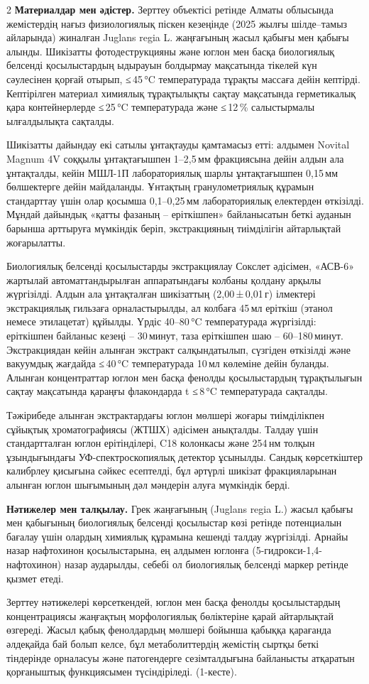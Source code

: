 \begin{multicols}{2}
{\bfseries Материалдар мен әдістер.} Зерттеу объектісі ретінде Алматы
облысында жемістердің нағыз физиологиялық піскен кезеңінде (2025 жылғы
шілде--тамыз айларында) жиналған Juglans regia L. жаңғағының жасыл
қабығы мен қабығы алынды. Шикізатты фотодеструкцияны және юглон мен
басқа биологиялық белсенді қосылыстардың ыдырауын болдырмау мақсатында
тікелей күн сәулесінен қорғай отырып, ≤\,45\,°C температурада тұрақты
массаға дейін кептірді. Кептірілген материал химиялық тұрақтылықты
сақтау мақсатында герметикалық қара контейнерлерде ≤\,25\,°C
температурада және ≤\,12\,\% салыстырмалы ылғалдылықта сақталды.

Шикізатты дайындау екі сатылы ұнтақтауды қамтамасыз етті: алдымен
Novital Magnum 4V соққылы ұнтақтағышпен 1--2,5\,мм фракциясына дейін
алдын ала ұнтақталды, кейін МШЛ-1П лабораториялық шарлы ұнтақтағышпен
0,15\,мм бөлшектерге дейін майдаланды. Ұнтақтың гранулометриялық құрамын
стандарттау үшін олар қосымша 0,1--0,25\,мм лабораториялық електерден
өткізілді. Мұндай дайындық «қатты фазаның -- еріткішпен» байланысатын
беткі ауданын барынша арттыруға мүмкіндік беріп, экстракцияның
тиімділігін айтарлықтай жоғарылатты.

Биологиялық белсенді қосылыстарды экстракциялау Сокслет әдісімен,
«АСВ-6» жартылай автоматтандырылған аппаратындағы колбаны қолдану арқылы
жүргізілді. Алдын ала ұнтақталған шикізаттың (2,00\,±\,0,01\,г)
ілмектері экстракциялық гильзаға орналастырылды, ал колбаға 45\,мл
еріткіш (этанол немесе этилацетат) құйылды. Үрдіс 40--80\,°C
температурада жүргізілді: еріткішпен байланыс кезеңі -- 30\,минут, таза
еріткішпен шаю -- 60--180\,минут. Экстракциядан кейін алынған экстракт
салқындатылып, сүзгіден өткізілді және вакуумдық жағдайда ≤\,40\,°C
температурада 10\,мл көлеміне дейін буланды. Алынған концентраттар юглон
мен басқа фенолды қосылыстардың тұрақтылығын сақтау мақсатында қараңғы
флакондарда t ≤\,8\,°C температурада сақталды.

Тәжірибеде алынған экстрактардағы юглон мөлшері жоғары тиімділікпен
сұйықтық хроматографиясы (ЖТШХ) әдісімен анықталды. Талдау үшін
стандартталған юглон ерітінділері, C18 колонкасы және 254\,нм толқын
ұзындығындағы УФ-спектроскопиялық детектор ұсынылды. Сандық көрсеткіштер
калибрлеу қисығына сәйкес есептелді, бұл әртүрлі шикізат фракцияларынан
алынған юглон шығымының дәл мәндерін алуға мүмкіндік берді.

{\bfseries Нәтижелер мен талқылау.} Грек жаңғағының (Juglans regia L.)
жасыл қабығы мен қабығының биологиялық белсенді қосылыстар көзі ретінде
потенциалын бағалау үшін олардың химиялық құрамына кешенді талдау
жүргізілді. Арнайы назар нафтохинон қосылыстарына, ең алдымен юглонға
(5-гидрокси-1,4-нафтохинон) назар аударылды, себебі ол биологиялық
белсенді маркер ретінде қызмет етеді.

Зерттеу нәтижелері көрсеткендей, юглон мен басқа фенолды қосылыстардың
концентрациясы жаңғақтың морфологиялық бөліктеріне қарай айтарлықтай
өзгереді. Жасыл қабық фенолдардың мөлшері бойынша қабыққа қарағанда
әлдеқайда бай болып келсе, бұл метаболиттердің жемістің сыртқы беткі
тіндерінде орналасуы және патогендерге сезімталдығына байланысты
атқаратын қорғаныштық функциясымен түсіндіріледі. (1-кесте).
\end{multicols}

